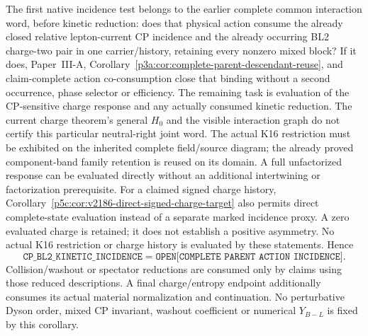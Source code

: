 \documentclass[12pt,a4paper]{article}
\begin{document}
\begin{corollary}
The first native incidence test belongs to the earlier complete common
interaction word, before kinetic reduction: does that physical action consume
the already closed relative lepton-current CP incidence and the already
occurring BL2 charge-two pair in one carrier/history, retaining every nonzero
mixed block?  If it does, Paper~III-A,
Corollary~\ref{p3a:cor:complete-parent-descendant-reuse}, and claim-complete
action co-consumption close that binding without a second occurrence, phase
selector or efficiency.  The remaining task is evaluation of the CP-sensitive
charge response and any actually consumed kinetic reduction.
The current charge theorem's general \(H_0\) and the visible interaction
graph do not certify this particular neutral-right joint word.  The actual
K16 restriction must be exhibited on the inherited complete field/source
diagram; the already proved component-band family retention is reused on
its domain.  A full unfactorized response can be evaluated directly without
an additional intertwining or factorization prerequisite.  For a claimed
signed charge history, Corollary~\ref{p5c:cor:v2186-direct-signed-charge-target}
also permits direct complete-state evaluation instead of a separate marked
incidence proxy.  A zero evaluated charge is retained; it does not establish
a positive asymmetry.  No actual K16 restriction or charge history is
evaluated by these statements.  Hence
\[
 \boxed{
 \texttt{CP\_BL2\_KINETIC\_INCIDENCE}
 =\texttt{OPEN[COMPLETE\ PARENT\ ACTION\ INCIDENCE]}.}
\]
Collision/washout or spectator reductions are consumed only by claims using
those reduced descriptions.  A final charge/entropy endpoint additionally
consumes its actual material normalization and continuation.  No perturbative
Dyson order, mixed CP invariant, washout coefficient or numerical $Y_{B-L}$ is
fixed by this corollary.
\end{corollary}
\end{document}
